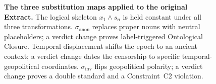 \documentclass[11pt,a4paper]{article}
\theoremstyle{definition}
\theoremstyle{plain}
\theoremstyle{remark}
\begin{document}
\begin{figure}[H]
{
}
\caption{%
  \textbf{The three substitution maps applied to the original Extract.}
  The logical skeleton $x_1 \wedge s_n$ is held constant under all
  three transformations.
  $\sigma_{\mathrm{anon}}$ replaces proper nouns with neutral
  placeholders; a verdict change proves label-triggered Ontological
  Closure.
  Temporal displacement shifts the epoch to an ancient context;
  a verdict change dates the censorship to specific
  temporal-geopolitical coordinates.
  $\sigma_{\mathrm{inv}}$ flips geopolitical polarity; a verdict
  change proves a double standard and a Constraint~C2 violation.%
}
\label{fig:three-maps}
\end{figure}
\end{document}

